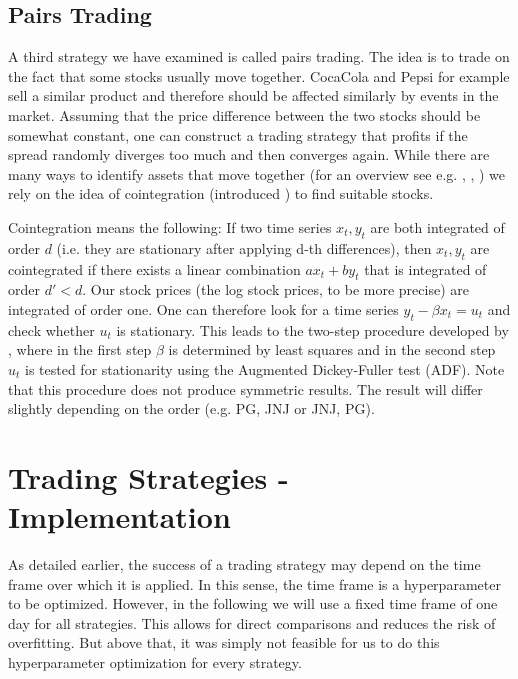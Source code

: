 \subsection{Pairs Trading}
A third strategy we have examined is called pairs trading. The idea is to trade on the fact that some stocks usually move together. CocaCola and Pepsi for example sell a similar product and therefore should be affected similarly by events in the market. Assuming that the price difference between the two stocks should be somewhat constant, one can construct a trading strategy that profits if the spread randomly diverges too much and then converges again. While there are many ways to identify assets that move together (for an overview see e.g. \cite{gatev_pairs_1999}, \cite{ganapathy_vidyamurthy_pairs_2004}, \cite{do_new_2006}) we rely on the idea of cointegration (introduced \cite{engle_co-integration_1987}) to find suitable stocks. 

Cointegration means the following: If two time series $x_t, y_t$ are both integrated of order $d$ (i.e. they are stationary after applying d-th differences), then $x_t, y_t$ are cointegrated if there exists a linear combination $a x_t + b y_t$ that is integrated of order $d' < d$. Our stock prices (the log stock prices, to be more precise) are integrated of order one. One can therefore look for a time series  $y_t - \beta x_t = u_t$ and check whether $u_t$ is stationary. This leads to the two-step procedure developed by \cite{engle_co-integration_1987}, where in the first step $\beta$ is determined by least squares and in the second step $u_t$ is tested for stationarity using the Augmented Dickey-Fuller test (ADF). Note that this procedure does not produce symmetric results. The result will differ slightly depending on the order (e.g. PG, JNJ or JNJ, PG). 

\section{Trading Strategies - Implementation}
As detailed earlier, the success of a trading strategy may depend on the time frame over which it is applied. In this sense, the time frame is a hyperparameter to be optimized. However, in the following we will use a fixed time frame of one day for all strategies. This allows for direct comparisons and reduces the risk of overfitting. But above that, it was simply not feasible for us to do this hyperparameter optimization for every strategy. 

